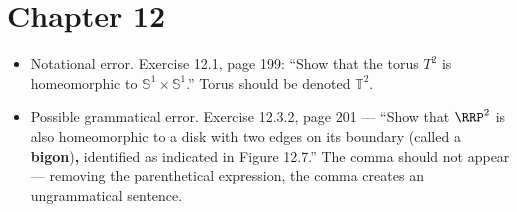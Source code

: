 \documentclass{fkletter}
\begin{document}
\section*{Chapter 12}
\begin{itemize}
  \item Notational error. Exercise 12.1, page 199: ``Show that the torus
    {\color{red}$T^2$} is homeomorphic to $\mathbb{S}^1 \times \mathbb{S}^1$.''
    Torus should be denoted $\mathbb{T}^2$.
  \item Possible grammatical error. Exercise 12.3.2, page 201 --- ``Show that
    $\RRP^2$ is also homeomorphic to a disk with two edges on its boundary
    (called a \textbf{bigon}){\bfseries \color{red},} identified as indicated in
    Figure 12.7.'' The comma should not appear --- removing the parenthetical
    expression, the comma creates an ungrammatical sentence.
\end{itemize}
\end{document}

